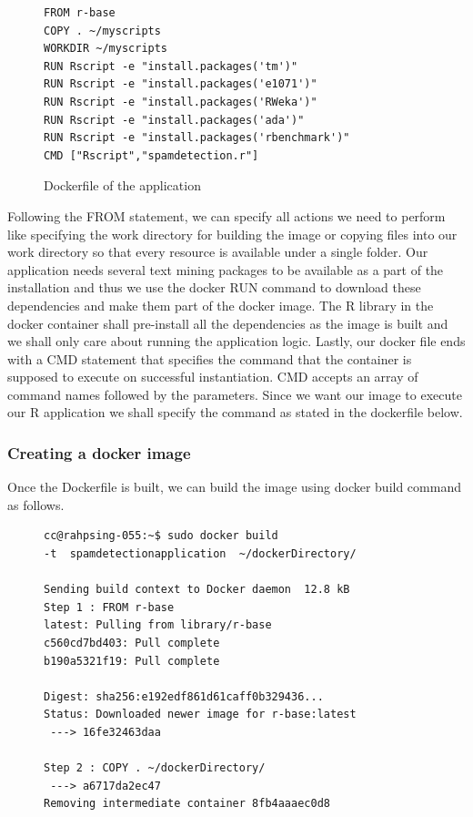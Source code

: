 \documentclass[9pt,twocolumn,twoside]{../../styles/osajnl}
\begin{document}
{\begin{figure}[h]
\begin{verbatim}
FROM r-base
COPY . ~/myscripts
WORKDIR ~/myscripts
RUN Rscript -e "install.packages('tm')"
RUN Rscript -e "install.packages('e1071')"
RUN Rscript -e "install.packages('RWeka')"
RUN Rscript -e "install.packages('ada')"
RUN Rscript -e "install.packages('rbenchmark')"
CMD ["Rscript","spamdetection.r"]
\end{verbatim}
\caption{Dockerfile of the application}
\label{Dockerfile of the application}
\end{figure}

\noindent
Following the FROM statement, we can specify all actions we need to
perform like specifying the work directory for building the image or
copying files into our work directory so that every resource is
available under a single folder. Our application needs several text
mining packages to be available as a part of the installation and thus
we use the docker RUN command to download these dependencies and make
them part of the docker image. The R library in the docker container
shall pre-install all the dependencies as the image is built and we
shall only care about running the application logic. Lastly, our
docker file ends with a CMD statement that specifies the command that
the container is supposed to execute on successful instantiation. CMD
accepts an array of command names followed by the parameters. Since we
want our image to execute our R application we shall specify the
command as stated in the dockerfile below.

\subsubsection{Creating a docker image}
Once the Dockerfile is built, we can build the image using docker
build command as follows.
\begin{figure}[h]
\begin{verbatim}
cc@rahpsing-055:~$ sudo docker build 
-t  spamdetectionapplication  ~/dockerDirectory/

Sending build context to Docker daemon  12.8 kB
Step 1 : FROM r-base
latest: Pulling from library/r-base
c560cd7bd403: Pull complete 
b190a5321f19: Pull complete 

Digest: sha256:e192edf861d61caff0b329436...
Status: Downloaded newer image for r-base:latest
 ---> 16fe32463daa

Step 2 : COPY . ~/dockerDirectory/
 ---> a6717da2ec47
Removing intermediate container 8fb4aaaec0d8


\end{verbatim}
\end{figure}}
\end{document}
